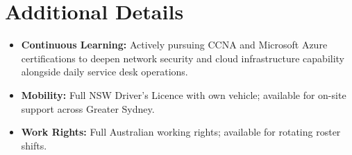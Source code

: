 \documentclass[letterpaper,10pt]{article}
\begin{document}
\section{Additional Details}
\begin{itemize}
  \item \textbf{Continuous Learning:} Actively pursuing CCNA and Microsoft Azure certifications to deepen network security and cloud infrastructure capability alongside daily service desk operations.
  \item \textbf{Mobility:} Full NSW Driver's Licence with own vehicle; available for on-site support across Greater Sydney.
  \item \textbf{Work Rights:} Full Australian working rights; available for rotating roster shifts.
\end{itemize}
\end{document}
